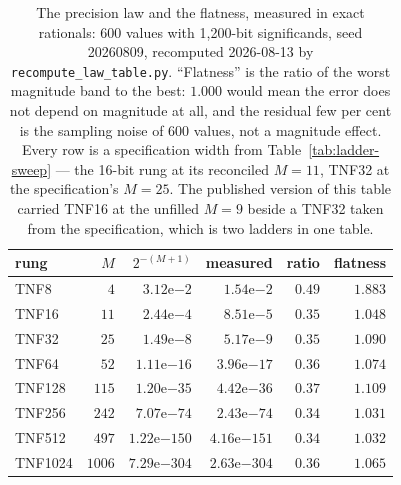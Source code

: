 \documentclass[11pt]{article}
\theoremstyle{definition}
\begin{document}
\begin{table}[t]\centering
\caption{The precision law and the flatness, measured in exact rationals: 600
values with 1{,}200-bit significands, seed 20260809, recomputed
2026-08-13 by \texttt{recompute\_law\_table.py}. ``Flatness'' is the ratio of the
worst magnitude band to the best: $1.000$ would mean the error does not depend on
magnitude at all, and the residual few per cent is the sampling noise of 600
values, not a magnitude effect. Every row is a specification width from
Table~\ref{tab:ladder-sweep} --- the 16-bit rung at its reconciled $M{=}11$,
TNF32 at the specification's $M{=}25$. The published version of this table
carried TNF16 at the unfilled $M{=}9$ beside a TNF32 taken from the
specification, which is two ladders in one table.}
\label{tab:law}
\begin{tabular}{lrrrrr}
\toprule
rung & $M$ & $2^{-(M+1)}$ & measured & ratio & flatness \\
\midrule
TNF8    & $4$    & $3.12\mathrm{e}{-2}$   & $1.54\mathrm{e}{-2}$   & $0.49$ & $1.883$ \\
TNF16   & $11$   & $2.44\mathrm{e}{-4}$   & $8.51\mathrm{e}{-5}$   & $0.35$ & $1.048$ \\
TNF32   & $25$   & $1.49\mathrm{e}{-8}$   & $5.17\mathrm{e}{-9}$   & $0.35$ & $1.090$ \\
TNF64   & $52$   & $1.11\mathrm{e}{-16}$  & $3.96\mathrm{e}{-17}$  & $0.36$ & $1.074$ \\
TNF128  & $115$  & $1.20\mathrm{e}{-35}$  & $4.42\mathrm{e}{-36}$  & $0.37$ & $1.109$ \\
TNF256  & $242$  & $7.07\mathrm{e}{-74}$  & $2.43\mathrm{e}{-74}$  & $0.34$ & $1.031$ \\
TNF512  & $497$  & $1.22\mathrm{e}{-150}$ & $4.16\mathrm{e}{-151}$ & $0.34$ & $1.032$ \\
TNF1024 & $1006$ & $7.29\mathrm{e}{-304}$ & $2.63\mathrm{e}{-304}$ & $0.36$ & $1.065$ \\
\bottomrule
\end{tabular}
\end{table}
\end{document}
